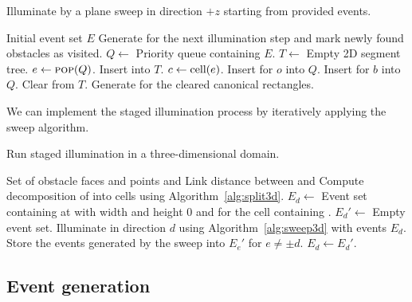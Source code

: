 \documentclass[english,gradu]{tktltiki2018}
\begin{document}
\begin{algorithm}
\caption{Illuminate by a plane sweep in direction $+z$ starting from provided events.}\label{alg:sweep3d}
\begin{algorithmic}
\Require Initial event set $E$
\Ensure Generate \addEs for the next illumination step and mark newly found obstacles as visited.
\State $Q\gets$ Priority queue containing $E$.
\State $T\gets$ Empty 2D segment tree.
	\State $e\gets\textsc{pop}(Q)$.
		\State Insert  into $T$.
			\State $c\gets\text{cell}(e)$.
				\State Insert \obsE for $o$ into $Q$.
			\EndFor
				\State Insert \cellE for $b$ into $Q$.
			\EndFor
		\EndIf
		\State Clear  from $T$.
		\State Generate \addEs for the cleared canonical rectangles.
	\EndIf
\EndWhile
\end{algorithmic}
\end{algorithm}

We can implement the staged illumination process by iteratively applying the sweep algorithm.

\begin{algorithm}
\caption{Run staged illumination in a three-dimensional domain.}\label{alg:minlink3d}
\begin{algorithmic}
\Require Set of obstacle faces and points \spt and \ept
\Ensure Link distance between \spt and \ept
\State Compute decomposition of \fspace into cells using Algorithm~\ref{alg:split3d}.
	\State $E_d\gets$ Event set containing \addE at \spt with width and height 0 and \cellE for the cell containing \spt.
\EndFor
{}
		\State $E_d'\gets$ Empty event set.
	\EndFor
		\State Illuminate in direction $d$ using Algorithm~\ref{alg:sweep3d} with events $E_d$.
		\State Store the events generated by the sweep into $E_e'$ for $e\neq\pm d$.
	\EndFor
		\State $E_d\gets E_d'$.
	\EndFor
\EndWhile
\end{algorithmic}
\end{algorithm}

\subsection{Event generation}\label{sec:evtgen}
\end{document}
